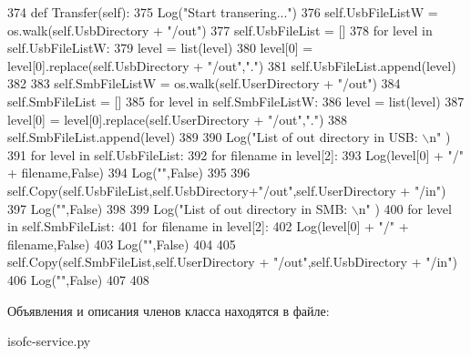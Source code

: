 \begin{DoxyCode}
374     \textcolor{keyword}{def }Transfer(self):
375         Log(\textcolor{stringliteral}{"Start transering..."})
376         self.UsbFileListW = os.walk(self.UsbDirectory + \textcolor{stringliteral}{"/out"})
377         self.UsbFileList = []
378         \textcolor{keywordflow}{for} level \textcolor{keywordflow}{in} self.UsbFileListW:
379             level = list(level)
380             level[0] = level[0].replace(self.UsbDirectory + \textcolor{stringliteral}{"/out"},\textcolor{stringliteral}{"."})
381             self.UsbFileList.append(level)
382 
383         self.SmbFileListW = os.walk(self.UserDirectory + \textcolor{stringliteral}{"/out"})
384         self.SmbFileList = []
385         \textcolor{keywordflow}{for} level \textcolor{keywordflow}{in} self.SmbFileListW:
386             level = list(level)
387             level[0] = level[0].replace(self.UserDirectory + \textcolor{stringliteral}{"/out"},\textcolor{stringliteral}{"."})
388             self.SmbFileList.append(level)
389 
390         Log(\textcolor{stringliteral}{"List of out directory in USB: \(\backslash\)n"} )
391         \textcolor{keywordflow}{for} level \textcolor{keywordflow}{in} self.UsbFileList:
392             \textcolor{keywordflow}{for} filename \textcolor{keywordflow}{in} level[2]:
393                 Log(level[0] + \textcolor{stringliteral}{"/"} + filename,\textcolor{keyword}{False})
394         Log(\textcolor{stringliteral}{""},\textcolor{keyword}{False})
395 
396         self.Copy(self.UsbFileList,self.UsbDirectory+\textcolor{stringliteral}{"/out"},self.UserDirectory + \textcolor{stringliteral}{"/in"})
397         Log(\textcolor{stringliteral}{""},\textcolor{keyword}{False})
398 
399         Log(\textcolor{stringliteral}{"List of out directory in SMB: \(\backslash\)n"} )
400         \textcolor{keywordflow}{for} level \textcolor{keywordflow}{in} self.SmbFileList:
401             \textcolor{keywordflow}{for} filename \textcolor{keywordflow}{in} level[2]:
402                 Log(level[0] + \textcolor{stringliteral}{"/"} + filename,\textcolor{keyword}{False})
403         Log(\textcolor{stringliteral}{""},\textcolor{keyword}{False})
404 
405         self.Copy(self.SmbFileList,self.UserDirectory + \textcolor{stringliteral}{"/out"},self.UsbDirectory + \textcolor{stringliteral}{"/in"})
406         Log(\textcolor{stringliteral}{""},\textcolor{keyword}{False})
407 
408 
\end{DoxyCode}


Объявления и описания членов класса находятся в файле\+:\begin{DoxyCompactItemize}
\item 
isofc-\/service.\+py\end{DoxyCompactItemize}
